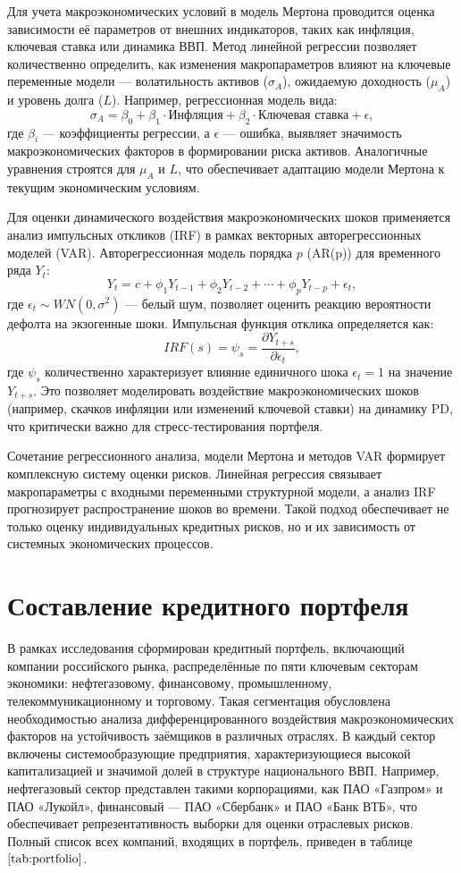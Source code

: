 \documentclass[]{article}
\begin{document}
	Для учета макроэкономических условий в модель Мертона проводится оценка зависимости её параметров от внешних индикаторов, таких как инфляция, ключевая ставка или динамика ВВП. Метод линейной регрессии позволяет количественно определить, как изменения макропараметров влияют на ключевые переменные модели — волатильность активов (\(\sigma_A\)), ожидаемую доходность (\(\mu_A\)) и уровень долга (\(L\)). Например, регрессионная модель вида:  
	\[
	\sigma_A = \beta_0 + \beta_1 \cdot \text{Инфляция} + \beta_2 \cdot \text{Ключевая\ ставка} + \epsilon,
	\]  
	где \(\beta_i\) — коэффициенты регрессии, а \(\epsilon\) — ошибка, выявляет значимость макроэкономических факторов в формировании риска активов. Аналогичные уравнения строятся для \(\mu_A\) и \(L\), что обеспечивает адаптацию модели Мертона к текущим экономическим условиям.  
	
	Для оценки динамического воздействия макроэкономических шоков применяется анализ импульсных откликов (IRF) в рамках векторных авторегрессионных моделей (VAR). Авторегрессионная модель порядка \(p\) (AR(p)) для временного ряда \(Y_t\):  
	\[
	Y_t = c + \phi_1 Y_{t-1} + \phi_2 Y_{t-2} + \cdots + \phi_p Y_{t-p} + \epsilon_t,
	\]  
	где \(\epsilon_t \sim WN(0, \sigma^2)\) — белый шум, позволяет оценить реакцию вероятности дефолта на экзогенные шоки. Импульсная функция отклика определяется как:  
	\[
	IRF(s) = \psi_s = \frac{\partial Y_{t+s}}{\partial \epsilon_t},
	\]  
	где \(\psi_s\) количественно характеризует влияние единичного шока \(\epsilon_t = 1\) на значение \(Y_{t+s}\). Это позволяет моделировать воздействие макроэкономических шоков (например, скачков инфляции или изменений ключевой ставки) на динамику PD, что критически важно для стресс-тестирования портфеля.  
	
	Сочетание регрессионного анализа, модели Мертона и методов VAR формирует комплексную систему оценки рисков. Линейная регрессия связывает макропараметры с входными переменными структурной модели, а анализ IRF прогнозирует распространение шоков во времени. Такой подход обеспечивает не только оценку индивидуальных кредитных рисков, но и их зависимость от системных экономических процессов.
	
	
	\section{Составление кредитного портфеля}
	
	В рамках исследования сформирован кредитный портфель, включающий компании российского рынка, распределённые по пяти ключевым секторам экономики: нефтегазовому, финансовому, промышленному, телекоммуникационному и торговому. Такая сегментация обусловлена необходимостью анализа дифференцированного воздействия макроэкономических факторов на устойчивость заёмщиков в различных отраслях. В каждый сектор включены системообразующие предприятия, характеризующиеся высокой капитализацией и значимой долей в структуре национального ВВП. Например, нефтегазовый сектор представлен такими корпорациями, как ПАО «Газпром» и ПАО «Лукойл», финансовый — ПАО «Сбербанк» и ПАО «Банк ВТБ», что обеспечивает репрезентативность выборки для оценки отраслевых рисков. Полный список всех компаний, входящих в портфель, приведен в таблице $\ref{tab:portfolio}$.
	
\end{document}
